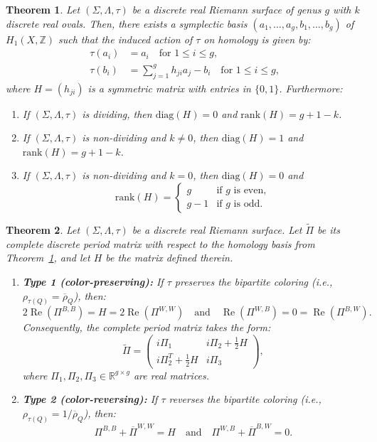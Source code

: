 \documentclass[10pt,a4paper]{amsart}
\newtheorem{theorem}{Theorem}
\newcommand{\R}{\mathds{R}}
\renewcommand{\Re}{\operatorname{Re}}
\newcommand{\Z}{\mathds{Z}}
\begin{document}
\begin{theorem}\label{th:realhomology_discrete}
	Let $(\Sigma, \Lambda, \tau)$ be a discrete real Riemann surface of genus $g$ with $k$ discrete real ovals. Then, there exists a symplectic basis $(a_1, \ldots, a_g, b_1, \ldots, b_g)$ of $H_1(X,\Z)$ such that the induced action of $\tau$ on homology is given by:
	\begin{align*}
		\tau(a_i) &= a_i \quad \text{for } 1 \leq i \leq g,\\
		\tau(b_i) &= \sum_{j=1}^g h_{ji} a_j - b_i \quad \text{for } 1 \leq i \leq g,
	\end{align*}
	where $H = (h_{ji})$ is a symmetric matrix with entries in $\{0,1\}$. Furthermore:
	\begin{enumerate}
		\item[(i)] If $(\Sigma, \Lambda, \tau)$ is dividing, then $\mathrm{diag}(H) = 0$ and $\mathrm{rank}(H) = g + 1 - k$.
		\item[(ii)] If $(\Sigma, \Lambda, \tau)$ is non-dividing and $k \neq 0$, then $\mathrm{diag}(H) = 1$ and $\mathrm{rank}(H) = g + 1 - k$.
		\item[(iii)] If $(\Sigma, \Lambda, \tau)$ is non-dividing and $k = 0$, then $\mathrm{diag}(H) = 0$ and
		\[
		\mathrm{rank}(H) =
		\begin{cases}
			g & \text{if } g \text{ is even}, \\
			g - 1 & \text{if } g \text{ is odd}.
		\end{cases}
		\]
	\end{enumerate}
\end{theorem}

\begin{theorem} \label{th:completeperiodmatrix}
	Let $(\Sigma, \Lambda, \tau)$ be a discrete real Riemann surface. Let $\tilde{\Pi}$ be its complete discrete period matrix with respect to the homology basis from Theorem~\ref{th:realhomology_discrete}, and let $H$ be the matrix defined therein.
	\begin{enumerate}
		\item[(i)] \textbf{Type 1 (color-preserving):} If $\tau$ preserves the bipartite coloring (i.e., $\rho_{\tau(Q)} = \overline{\rho}_{Q}$), then:
		\[ 2 \Re(\Pi^{B,B}) = H = 2 \Re(\Pi^{W,W}) \quad \text{and} \quad \Re(\Pi^{W,B}) = 0 = \Re(\Pi^{B,W}). \]
		Consequently, the complete period matrix takes the form:
		\[ \tilde{\Pi} = \begin{pmatrix}
			i \Pi_1 & i \Pi_2 + \frac{1}{2} H \\
			i \Pi_2^T + \frac{1}{2} H & i \Pi_3
		\end{pmatrix}, \]
		where $\Pi_1, \Pi_2, \Pi_3 \in \R^{g \times g}$ are real matrices.
		\item[(ii)] \textbf{Type 2 (color-reversing):} If $\tau$ reverses the bipartite coloring (i.e., $\rho_{\tau(Q)} = 1/\overline{\rho}_{Q}$), then:
		\[ \Pi^{B,B} + \overline{\Pi}^{W,W} = H \quad \text{and} \quad \Pi^{W,B} + \overline{\Pi}^{B,W} = 0. \]
	\end{enumerate}
\end{theorem}
\end{document}
